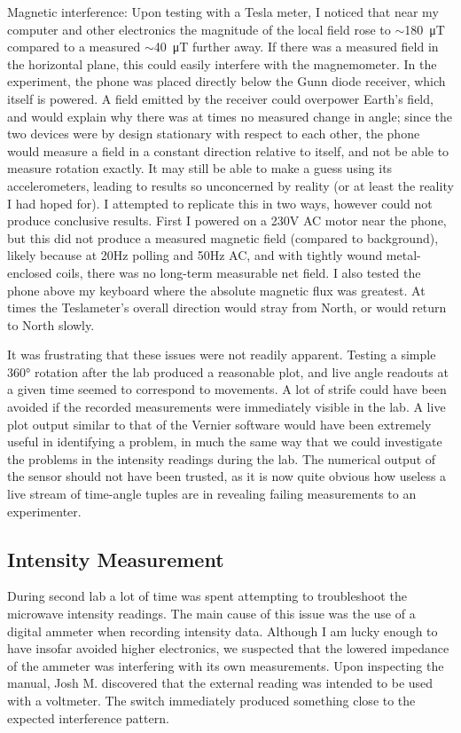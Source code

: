 Magnetic interference:
Upon testing with a Tesla meter, I noticed that near my computer and other electronics the magnitude of the local field rose to 
$\sim$\SI{180}{\micro\tesla} compared to a measured $\sim$\SI{40}{\micro\tesla} further away. If there was a measured field in the horizontal plane, this could easily interfere with the magnemometer. In the experiment, the phone was placed directly below the Gunn diode receiver, which itself is powered. A field emitted by the receiver could overpower Earth's field, and would explain why there was at times no measured change in angle; since the two devices were by design stationary with respect to each other, the phone would measure a field in a constant direction relative to itself, and not be able to measure rotation exactly. It may still be able to make a guess using its accelerometers, leading to results so unconcerned by reality (or at least the reality I had hoped for).
I attempted to replicate this in two ways, however could not produce conclusive results. First I powered on a 230V AC motor near the phone, but this did not produce a measured magnetic field (compared to background), likely because at 20Hz polling and 50Hz AC, and with tightly wound metal-enclosed coils, there was no long-term measurable net field. I also tested the phone above my keyboard where the absolute magnetic flux was greatest. At times the Teslameter's overall direction would stray from North, or would return to North slowly. 

It was frustrating that these issues were not readily apparent. Testing a simple 360° rotation after the lab produced a reasonable plot, and live angle readouts at a given time seemed to correspond to movements.
A lot of strife could have been avoided if the recorded measurements were immediately visible in the lab. A live plot output similar to that of the Vernier software would have been extremely useful in identifying a problem, in much the same way that we could investigate the problems in the intensity readings during the lab. The numerical output of the sensor should not have been trusted, as it is now quite obvious how useless a live stream of time-angle tuples are in revealing failing measurements to an experimenter.

\subsection*{Intensity Measurement}

During second lab a lot of time was spent attempting to troubleshoot the microwave intensity readings. The main cause of this issue was the use of a digital ammeter when recording intensity data. Although I am lucky enough to have insofar avoided higher electronics, we suspected that the lowered impedance of the ammeter was interfering with its own measurements. Upon inspecting the manual, Josh M. discovered that the external reading was intended to be used with a voltmeter. The switch immediately produced something close to the expected interference pattern.


